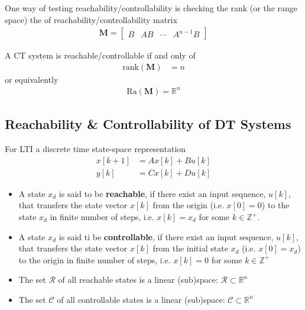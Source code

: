 \documentclass[twoside]{article}
\begin{document}
One way of testing reachability/controllability is checking the rank
(or the range space) the of reachability/controllability matrix
%
\begin{align*}
  \mathbf{M} = \left[ \begin{array}{cccc} B & A B & \cdots & A^{n-1} B \end{array} \right]
\end{align*} 
%

A CT system is reachable/controllable if and only of
%
\begin{align*}
  \mathrm{rank} ( \mathbf{M} ) &= n
\end{align*} 
%
or equivalently 
%
\begin{align*}
 \mathrm{Ra} ( \mathbf{M} ) = \mathbb{R}^n
\end{align*} 


\subsection{Reachability \& Controllability of DT Systems}

For LTI a discrete time state-space representation
%
\begin{align*}
  x[k+1] &= A x[k] + B u[k]
\\
  y[k] &= C x[k] + D u[k]
\end{align*}
%
\begin{itemize}
  \item A state $x_d$ is said to be \textbf{reachable}, if there exist
  an input sequence, $u[k]$, that transfers the state vector 
  $x[k]$ from the origin (i.e. $x[0] = 0$) to the state $x_d$ in finite
  number of steps, i.e. $x[k] = x_d$ for some $k \in \mathbb{Z}^+$.
 
  \item A state $x_d$ is said ti be \textbf{controllable},
  if there exist an input sequence, $u[k]$, that transfers the state vector 
  $x[k]$ from the initial state $x_d$ (i.e. $x[0] = x_d$) to the origin
  in finite number of steps, i.e. $x[k] = 0$ for some $k \in \mathbb{Z}^+$ 
\end{itemize}

\begin{itemize}
  \item The set $\mathcal{R}$ of all reachable states is a linear
(sub)space: $\mathcal{R} \subset \mathbb{R}^n$
  \item The set $\mathcal{C}$ of all controllable states is a linear
(sub)space: $\mathcal{C} \subset \mathbb{R}^n$
\end{itemize}
\end{document}
